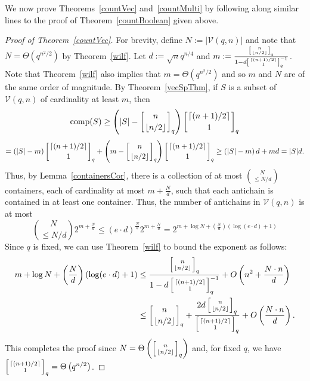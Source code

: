 \documentclass[11 pt]{article}
\theoremstyle{definition}
\theoremstyle{case}
\numberwithin{equation}{section}
\DeclareMathOperator{\comp}{comp}
\newcommand{\qbinom}[3]{\left[\genfrac{}{}{0pt}{}{#1}{#2}\right]_{#3}}
\newcommand{\Vectors}[2]{\mathcal{V}\left(#1,#2\right)}
\begin{document}
We now prove Theorems~\ref{countVec} and~\ref{countMulti} by following along similar lines to the proof of Theorem~\ref{countBoolean} given above. 

\begin{proof}[Proof of Theorem~\ref{countVec}]
For brevity, define $N:=|\mathcal{V}(q,n)|$ and note that $N=\Theta\left(q^{n^2/2}\right)$ by Theorem~\ref{wilf}. Let $d:=\sqrt{n}q^{n/4}$ and $m:=\frac{\qbinom{n}{\left\lfloor n/2\right\rfloor}{q}}{1-d\qbinom{\left\lceil (n+1)/2\right\rceil}{1}{q}^{-1}}$. Note that Theorem~\ref{wilf} also implies that $m=\Theta\left(q^{n^2/2}\right)$ and so $m$ and $N$ are of the same order of magnitude. By Theorem~\ref{vecSpThm}, if $S$ is a subset of $\Vectors{q}{n}$ of cardinality at least $m$, then 
\[\comp(S)\geq \left(|S|-\qbinom{n}{\left\lfloor n/2\right\rfloor}{q}\right)\qbinom{\left\lceil (n+1)/2\right\rceil}{1}{q}\]
\[=\left(|S|-m\right)\qbinom{\left\lceil (n+1)/2\right\rceil}{1}{q} + \left(m-\qbinom{n}{\left\lfloor n/2\right\rfloor}{q}\right)\qbinom{\left\lceil (n+1)/2\right\rceil}{1}{q}\geq \left(|S|-m\right)d + md = |S|d.\]
Thus, by Lemma~\ref{containersCor}, there is a collection of at most $\binom{N}{\leq N/d}$ containers, each of cardinality at most $m+\frac{N}{d}$, such that each antichain is contained in at least one container. Thus, the number of antichains in $\Vectors{q}{n}$ is at most
\[\binom{N}{\leq N/d}2^{m+\frac{ N}{d}}\leq\left(e\cdot d\right)^{\frac{ N}{d}}2^{m+\frac{ N}{d}}= 2^{m+ \log N + \left(\frac{ N}{d}\right)\left(\log(e\cdot d) + 1\right)}\]
Since $q$ is fixed, we can use Theorem~\ref{wilf} to bound the exponent as follows:
\begin{align*}m+ \log N + \left(\frac{ N}{d}\right)\left(\log(e\cdot d) + 1\right) &\leq\frac{\qbinom{n}{\left\lfloor n/2\right\rfloor}{q}}{1-d\qbinom{\left\lceil (n+1)/2\right\rceil}{1}{q}^{-1}} + O\left(n^2 + \frac{ N\cdot n}{d}\right)\\
&\leq \qbinom{n}{\left\lfloor n/2\right\rfloor}{q} + \frac{2d\qbinom{n}{\left\lfloor n/2\right\rfloor}{q}}{\qbinom{\left\lceil (n+1)/2\right\rceil}{1}{q}} + O\left(\frac{ N\cdot n}{d}\right).\end{align*}
This completes the proof since $ N = \Theta\left(\qbinom{n}{\left\lfloor n/2\right\rfloor}{q}\right)$ and, for fixed $q$, we have $\qbinom{\left\lceil (n+1)/2\right\rceil}{1}{q}=\Theta\left(q^{n/2}\right)$. 
\end{proof}
\end{document}
